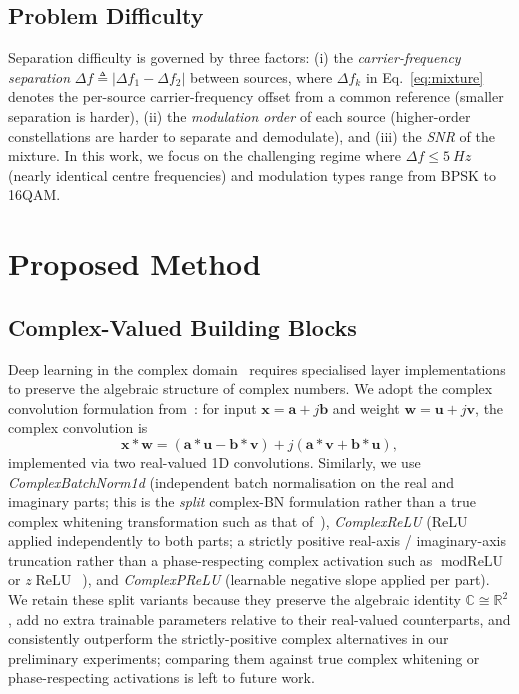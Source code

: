 \documentclass[twocolumn,english]{svjour3}
\begin{document}
\subsection{Problem Difficulty}

Separation difficulty is governed by three factors: (i) the \emph{carrier-frequency separation} $\Delta f \triangleq |\Delta f_1 - \Delta f_2|$ between sources, where $\Delta f_k$ in Eq.~\eqref{eq:mixture} denotes the per-source carrier-frequency offset from a common reference (smaller separation is harder), (ii) the \emph{modulation order} of each source (higher-order constellations are harder to separate and demodulate), and (iii) the \emph{SNR} of the mixture. In this work, we focus on the challenging regime where $\Delta f \leq \SI{5}{Hz}$ (nearly identical centre frequencies) and modulation types range from BPSK to 16QAM.

\section{Proposed Method}
\label{sec:method}

\subsection{Complex-Valued Building Blocks}

Deep learning in the complex domain~\cite{chen2019complex} requires specialised layer implementations to preserve the algebraic structure of complex numbers. We adopt the complex convolution formulation from~\cite{guo2024single}: for input $\mathbf{x} = \mathbf{a} + j\mathbf{b}$ and weight $\mathbf{w} = \mathbf{u} + j\mathbf{v}$, the complex convolution is
\begin{equation}
    \mathbf{x} \ast \mathbf{w} = (\mathbf{a} \ast \mathbf{u} - \mathbf{b} \ast \mathbf{v}) + j(\mathbf{a} \ast \mathbf{v} + \mathbf{b} \ast \mathbf{u}),
    \label{eq:complex_conv}
\end{equation}
implemented via two real-valued 1D convolutions. Similarly, we use \emph{ComplexBatchNorm1d} (independent batch normalisation on the real and imaginary parts; this is the \emph{split} complex-BN formulation rather than a true complex whitening transformation such as that of~\cite{trabelsi2018deep}), \emph{ComplexReLU} (ReLU applied independently to both parts; a strictly positive real-axis / imaginary-axis truncation rather than a phase-respecting complex activation such as $\operatorname{modReLU}$ or $z\operatorname{ReLU}$~\cite{trabelsi2018deep}), and \emph{ComplexPReLU} (learnable negative slope applied per part). We retain these split variants because they preserve the algebraic identity $\mathbb{C}\cong\mathbb{R}^2$, add no extra trainable parameters relative to their real-valued counterparts, and consistently outperform the strictly-positive complex alternatives in our preliminary experiments; comparing them against true complex whitening or phase-respecting activations is left to future work.
\end{document}
